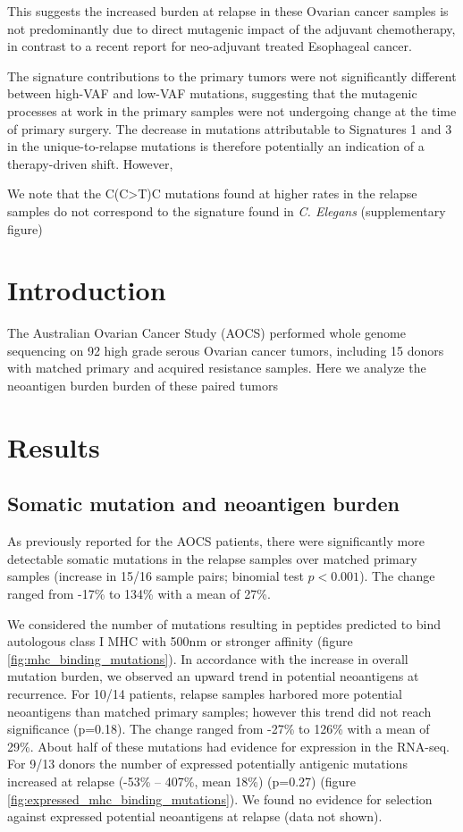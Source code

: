 This suggests the increased burden at relapse in these Ovarian cancer samples is not predominantly due to direct mutagenic impact of the adjuvant chemotherapy, in contrast to a recent report for neo-adjuvant treated Esophageal cancer.
 
The signature contributions to the primary tumors were not significantly different between high-VAF and low-VAF mutations, suggesting that the mutagenic processes at work in the primary samples were not undergoing change at the time of primary surgery. The decrease in mutations attributable to Signatures 1 and 3 in the unique-to-relapse mutations is therefore potentially an indication of a therapy-driven shift. However, 

We note that the C(C>T)C mutations found at higher rates in the relapse samples do not correspond to the signature found in \textit{C. Elegans} (supplementary figure)


\iffalse

\section*{Introduction}

The Australian Ovarian Cancer Study (AOCS)\cite{Patch_2015} performed whole genome sequencing on 92 high grade serous Ovarian cancer tumors, including 15 donors with matched primary and acquired resistance samples. Here we analyze the neoantigen burden burden of these paired tumors 


\section*{Results}
\subsection*{Somatic mutation and neoantigen burden}

As previously reported for the AOCS patients, there were significantly more detectable somatic mutations in the relapse samples over matched primary samples (increase in 15/16 sample pairs; binomial test $p \lt 0.001$). The change ranged from -17\% to 134\% with a mean of 27\%.

We considered the number of mutations resulting in peptides predicted to bind autologous class I MHC with 500nm or stronger affinity (figure \ref{fig:mhc_binding_mutations}). In accordance with the increase in overall mutation burden, we observed an upward trend in potential neoantigens at recurrence. For 10/14 patients, relapse samples harbored more potential neoantigens than matched primary samples; however this trend did not reach significance (p=0.18). The change ranged from -27\% to 126\% with a mean of 29\%. About half of these mutations had evidence for expression in the RNA-seq. For 9/13 donors the number of expressed potentially antigenic mutations increased at relapse (-53\% -- 407\%, mean 18\%) (p=0.27) (figure \ref{fig:expressed_mhc_binding_mutations}). We found no evidence for selection against expressed potential neoantigens at relapse (data not shown).

